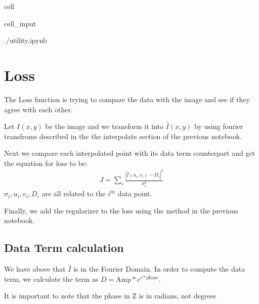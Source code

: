 \documentclass[letterpaper,10pt,english]{jupyterBook}
\begin{document}
\begin{sphinxuseclass}{cell}\begin{sphinxVerbatimInput}

\begin{sphinxuseclass}{cell_input}
\begin{sphinxVerbatim}[commandchars=\\\{\}]
 ./utility.ipynb
\end{sphinxVerbatim}

\end{sphinxuseclass}\end{sphinxVerbatimInput}

\end{sphinxuseclass}

\chapter{Loss}
\label{\detokenize{loss:loss}}\label{\detokenize{loss::doc}}
\sphinxAtStartPar
The Loss function is trying to compare the data with the image and see if they agree with each other.

\sphinxAtStartPar
Let \(I(x,y)\) be the image and we transform it into \(\hat{I} (x,y)\) by using fourier transfroms described in the the interpolate section of the previous notebook.

\sphinxAtStartPar
Next we compare each interpolated point with its data term counterpart and get the equation for loss to be:
\begin{equation*}
\begin{split}J = \sum_{i}\frac{|\hat{I}(u_i,v_i) - D_i|^2}{\sigma_i^2}\end{split}
\end{equation*}
\sphinxAtStartPar
\(\sigma_i, u_i, v_i, D_i\) are all related to the \(i^{th}\) data point.

\sphinxAtStartPar
Finally, we add the regularizer to the loss using the method in the previous notebook.


\section{Data Term calculation}
\label{\detokenize{loss:data-term-calculation}}
\sphinxAtStartPar
We have above that \(\hat{I}\) is in the Fourier Domain. In order to compute the data term, we calculate the term as \(D = \text{Amp} * e^{i*\text{phase}}\).

\sphinxAtStartPar
It is important to note that the phase in Z is in radians, not degrees
\end{document}
